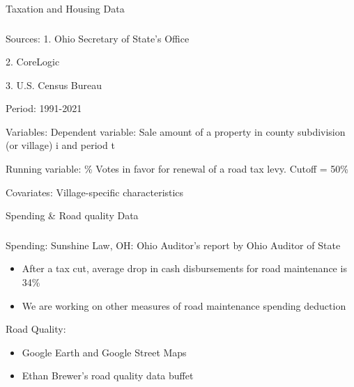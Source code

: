 \documentclass{beamer}
\begin{document}
\begin{frame}{Taxation and Housing Data}
\frametitle{}
    \label{data}
    \begin{block}{Sources:}
    1. Ohio Secretary of State's Office
    
    2. CoreLogic
    
    3. U.S. Census Bureau
    \end{block}
    
    \begin{block}{Period:}
    1991-2021
    \end{block}
    
    \begin{block}{Variables:}
    Dependent variable: Sale amount of a property in county subdivision (or village) i and period t
    
    Running variable: \% Votes in favor for renewal of a road tax levy. Cutoff = 50\%
    
    Covariates: Village-specific characteristics \hyperlink{variables}{}
    \end{block}
    
\end{frame}


\begin{frame}{Spending \& Road quality Data}
    \frametitle{}
    
    \begin{block}{Spending:}
        Sunshine Law, OH: Ohio Auditor's report by Ohio Auditor of State
        \begin{itemize}
            \item After a tax cut, average drop in cash disbursements for road maintenance is 34\%
            \item We are working on other measures of road maintenance spending deduction
        \end{itemize}        
    \end{block}

    \begin{block}{Road Quality:}
        \begin{itemize}
            \item Google Earth and Google Street Maps
            \item Ethan Brewer's road quality data buffet
        \end{itemize}        
    \end{block}


\end{frame}
\end{document}
